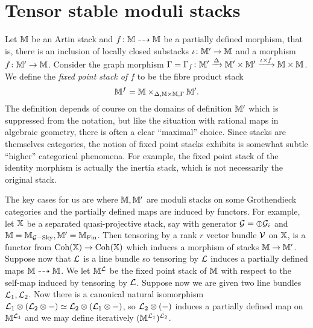 \documentclass[12pt]{amsart}
\begin{document}
\section{Tensor stable moduli stacks} \label{sc:equaliserstack}

Let $\mathbb{M}$ be an Artin stack and $f \colon \mathbb{M} \dashrightarrow \mathbb{M}$ be a partially defined morphism, that is, there is an inclusion of locally closed substacks $\iota \colon \mathbb{M}' \to \mathbb{M}$ and a morphism $f\colon \mathbb{M}' \to \mathbb{M}$. Consider the graph morphism $\Gamma = \Gamma_{f} \colon \mathbb{M}' \xrightarrow{\Delta} \mathbb{M}' \times \mathbb{M}' \xrightarrow{\iota \times f} \mathbb{M} \times \mathbb{M}$. We define the {\em fixed point stack of $f$} to be the fibre product stack
$$ \mathbb{M}^f = \mathbb{M} \times_{\Delta,\mathbb{M} \times \mathbb{M}, \Gamma} \mathbb{M}'.$$
The definition depends of course on the domains of definition $\mathbb{M}'$ which is suppressed from the notation, but like the situation with rational maps in algebraic geometry, there is often a clear ``maximal'' choice. Since stacks are themselves categories, the notion of fixed point stacks exhibits is somewhat subtle ``higher'' categorical phenomena. For example, the fixed point stack of the identity morphism is actually the inertia stack, which is not necessarily the original stack. 

The key cases for us are where $\mathbb{M}, \mathbb{M}'$ are moduli stacks on some Grothendieck categories and the partially defined maps are induced by functors. For example, let $\mathbb{X}$ be a separated quasi-projective stack, say with generator $\mathcal{G} = \oplus \mathcal{G}_i$ and $\mathbb{M} =  \mathbb{M}_{\mathcal{G}-\textup{Sky}}, \mathbb{M}' = \mathbb{M}_{\textup{Fin}}$. Then tensoring by a rank $r$ vector bundle $\mathcal{V}$ on $\mathbb{X}$, is a functor from $\operatorname{Coh}(\mathbb{X}) \to \operatorname{Coh}(\mathbb{X})$ which induces a morphism of stacks $\mathbb{M} \to \mathbb{M}'$. Suppose now that $\mathcal{L}$ is a line bundle so tensoring by $\mathcal{L}$ induces a partially defined maps $\mathbb{M} \dashrightarrow \mathbb{M}$. We let $\mathbb{M}^{\mathcal{L}}$ be the fixed point stack of $\mathbb{M}$ with respect to the self-map induced by tensoring by $\mathcal{L}$. Suppose now we are given two line bundles $\mathcal{L}_1,\mathcal{L}_2$. Now there is a canonical natural isomorphism $\mathcal{L}_1 \otimes (\mathcal{L}_2 \otimes -) \simeq \mathcal{L}_2 \otimes (\mathcal{L}_1 \otimes -)$, so $\mathcal{L}_2 \otimes (-)$ induces a partially defined map on $\mathbb{M}^{\mathcal{L}_1}$ and we may define iteratively $(\mathbb{M}^{\mathcal{L}_1})^{\mathcal{L}_2}$. 
\end{document}
